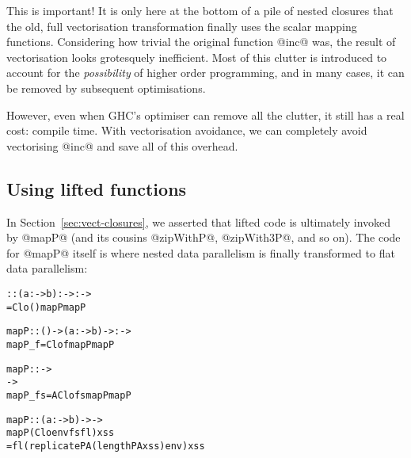 This is important! It is only here at the bottom of a pile of nested closures that the old, full vectorisation transformation finally uses the scalar mapping functions. Considering how trivial the original function @inc@ was, the result of vectorisation looks grotesquely inefficient. Most of this clutter is introduced to account for the \emph{possibility} of higher order programming, and in many cases, it can be removed by subsequent optimisations.

However, even when GHC's optimiser can remove all the clutter, it still has a real cost: compile time. With vectorisation avoidance, we can completely avoid vectorising @inc@ and save all of this overhead.

% 


\subsection{Using lifted functions}

In Section~\ref{sec:vect-closures}, we asserted that lifted code is ultimately invoked by @mapP@ (and its cousins @zipWithP@, @zipWith3P@, and so on). The code for @mapP@ itself is where nested data parallelism is finally transformed to flat data parallelism:
%
\begin{alltt}
   :: (a :-> b) :->  :-> 
   = Clo () mapP mapP
  
  mapP :: () -> (a :-> b) ->  :-> 
  mapP _ f = Clo f mapP mapP

  mapP :: \pa{()} ->  
        -> 
  mapP _ fs = AClo fs mapP mapP

  mapP :: (a :-> b) ->  -> 
  mapP (Clo env fs fl) xss 
    = fl (replicatePA (lengthPA xss) env) xss
\end{alltt}

